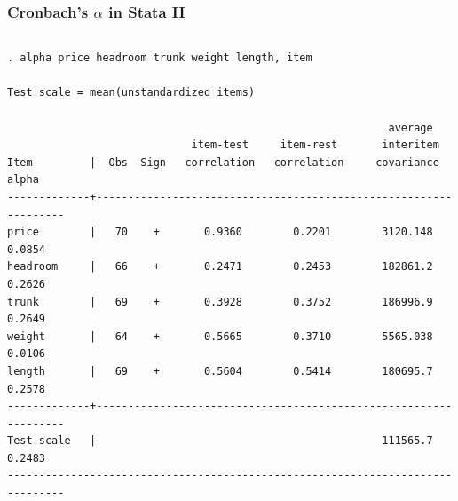 \begin{frame}[fragile]
\frametitle{Cronbach's $\alpha$ in Stata II}
\scriptsize
\begin{columns}
\column{\dimexpr\paperwidth-25pt}
\begin{verbatim}
. alpha price headroom trunk weight length, item

Test scale = mean(unstandardized items)

                                                            average
                             item-test     item-rest       interitem
Item         |  Obs  Sign   correlation   correlation     covariance      alpha
-------------+-----------------------------------------------------------------
price        |   70    +       0.9360        0.2201        3120.148      0.0854
headroom     |   66    +       0.2471        0.2453        182861.2      0.2626
trunk        |   69    +       0.3928        0.3752        186996.9      0.2649
weight       |   64    +       0.5665        0.3710        5565.038      0.0106
length       |   69    +       0.5604        0.5414        180695.7      0.2578
-------------+-----------------------------------------------------------------
Test scale   |                                             111565.7      0.2483
-------------------------------------------------------------------------------
\end{verbatim}
\end{columns}
\end{frame}








